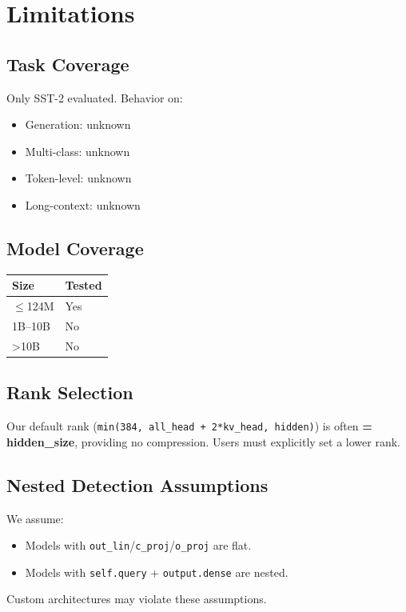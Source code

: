 \section{Limitations}

\subsection{Task Coverage}

Only SST-2 evaluated. Behavior on:
\begin{itemize}
\item Generation: unknown
\item Multi-class: unknown
\item Token-level: unknown
\item Long-context: unknown

\end{itemize}
\subsection{Model Coverage}

\begin{table}[H]
\centering
\small
\begin{tabular}{ll}
\toprule
\textbf{Size} & \textbf{Tested} \\
\midrule
$\le$124M & Yes \\
1B--10B & No \\
>10B & No \\
\bottomrule
\end{tabular}
\end{table}

\subsection{Rank Selection}

Our default rank (\texttt{min(384, all\_head + 2*kv\_head, hidden)}) is often 
\textbf{= hidden\_size}, providing no compression. Users must explicitly set a 
lower rank.

\subsection{Nested Detection Assumptions}

We assume:
\begin{itemize}
\item Models with \texttt{out\_lin}/\texttt{c\_proj}/\texttt{o\_proj} are flat.
\item Models with \texttt{self.query} + \texttt{output.dense} are nested.

\end{itemize}
Custom architectures may violate these assumptions.

